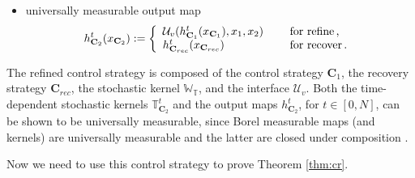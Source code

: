 \documentclass[letterpaper, 10 pt, conference]{amsart}
\theoremstyle{definition}
\theoremstyle{example}
\theoremstyle{remark}
\newcommand{\InF}{\mathcal{U}_{v}}
\newcommand{\C}{{\mathbf{C}}}
\newcommand{\Wt}{\mathbb{W}_{\mathbb{T}}}
\begin{document}
\begin{itemize}
\item universally  measurable output map \[h^t_{\C_2}(x_{\C_2}):= \left\{\begin{array}{ll}\InF(h^t_{\C_1}(x_{\C_1}),x_1, x_2) &\quad \mbox{ for $\operatorname{refine}$\,,}\\
h^t_{\C_{rec}}(x_{\C_{rec}}) &\quad \mbox{ for $\operatorname{recover}$\,.}\end{array}\right.\, \] 
 
\end{itemize}
The refined control strategy is composed of the control strategy $\C_1$, the recovery strategy $\C_{rec}$, the stochastic kernel $\Wt$, and the interface $\InF$.  
Both the time-dependent stochastic kernels $\mathbb T^t_{\C_2}$ and the output maps $h_{\C_2}^t$, for $t\in[0,N]$, can be shown to be universally measurable, 
since Borel measurable maps (and kernels) are universally measurable and the latter are closed under composition \cite[Ch.7]{bible}.  

Now we need to use this control strategy to prove Theorem \ref{thm:cr}.
\end{document}
